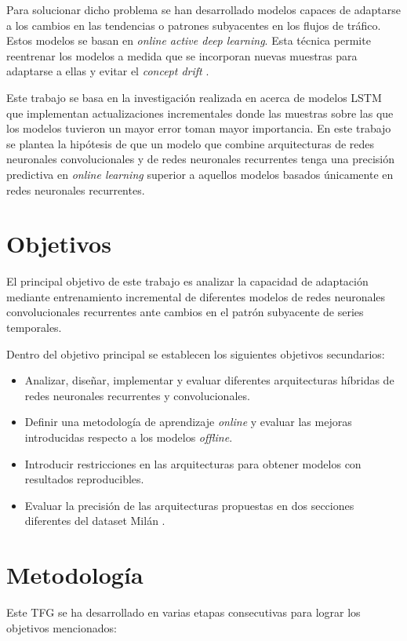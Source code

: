 Para solucionar dicho problema se han desarrollado modelos capaces de adaptarse a los cambios en las tendencias o patrones subyacentes en los flujos de tráfico. Estos modelos se basan en \textit{online active deep learning}. Esta técnica permite reentrenar los modelos a medida que se incorporan nuevas muestras para adaptarse a ellas y evitar el \textit{concept drift} \cite{conceptdrift, conceptdrift1, conceptdrift2}.

Este trabajo se basa en la investigación realizada en \cite{SKIMAcasaseca, tfgalicia} acerca de modelos LSTM que implementan actualizaciones incrementales donde las muestras sobre las que los modelos tuvieron un mayor error toman mayor importancia. En este trabajo se plantea la hipótesis de que un modelo que combine arquitecturas de redes neuronales convolucionales y de redes neuronales recurrentes tenga una precisión predictiva en \textit{online learning} superior a aquellos modelos basados únicamente en redes neuronales recurrentes.


\section{Objetivos}
El principal objetivo de este trabajo es analizar la capacidad de adaptación mediante entrenamiento incremental de diferentes modelos de redes neuronales convolucionales recurrentes ante cambios en el patrón subyacente de series temporales.

Dentro del objetivo principal se establecen los siguientes objetivos secundarios:
\begin{itemize}
	\item Analizar, diseñar, implementar y evaluar diferentes arquitecturas híbridas de redes neuronales recurrentes y convolucionales.
	\item Definir una metodología de aprendizaje \textit{online} y evaluar las mejoras introducidas respecto a los modelos \textit{offline}.
	\item Introducir restricciones en las arquitecturas para obtener modelos con resultados reproducibles.
	\item Evaluar la precisión de las arquitecturas propuestas en dos secciones diferentes del dataset Milán \cite{milandataset}.
\end{itemize}


\section{Metodología}
Este TFG se ha desarrollado en varias etapas consecutivas para lograr los objetivos mencionados:

